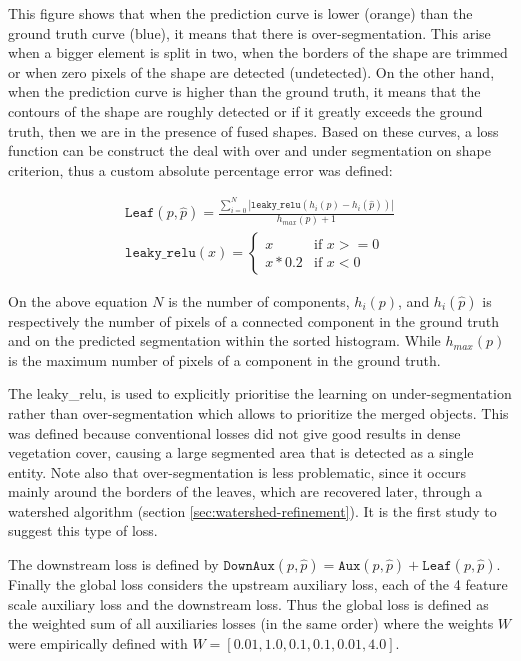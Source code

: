 \documentclass[../thesis.tex]{subfiles}
\begin{document}
    This figure shows that when the prediction curve is lower (orange) than the ground truth curve (blue), it means that there is over-segmentation. This arise when a bigger element is split in two, when the borders of the shape are trimmed or when zero pixels of the shape are detected (undetected). On the other hand, when the prediction curve is higher than the ground truth, it means that the contours of the shape are roughly detected or if it greatly exceeds the ground truth, then we are in the presence of fused shapes. Based on these curves, a loss function can be construct the deal with over and under segmentation on shape criterion, thus a custom absolute percentage error was defined:
    
    \begin{eqnarray}
    \texttt{Leaf}(p, \hat{p}) = \frac{\sum_{i=0}^{N} |\texttt{leaky\_relu}(h_i(p)-h_i(\hat{p}))| }{h_{max}(p)+1} \\
    \texttt{leaky\_relu}(x) =
    \begin{cases}
    \mbox{$x$} & \mbox{if } x >= 0\\
    \mbox{$x*0.2$} & \mbox{if } x < 0
    \end{cases}
    \end{eqnarray}
    
    On the above equation $N$ is the number of components, $h_i(p)$, and $h_i(\hat{p})$ is respectively the number of pixels of a connected component in the ground truth and on the predicted segmentation within the sorted histogram. While $h_{max}(p)$ is the maximum number of pixels of a component in the ground truth.
    
    \newpage
    The leaky\_relu, is used to explicitly prioritise the learning on under-segmentation rather than over-segmentation which allows to prioritize the merged objects. This was defined because conventional losses did not give good results in dense vegetation cover, causing a large segmented area that is detected as a single entity. Note also that over-segmentation is less problematic, since it occurs mainly around the borders of the leaves, which are recovered later, through a watershed algorithm (section \ref{sec:watershed-refinement}). It is the first study to suggest this type of loss.
    
    The downstream loss is defined by $\texttt{DownAux}(p, \hat{p}) = \texttt{Aux}(p, \hat{p}) + \texttt{Leaf}(p, \hat{p})$. Finally the global loss considers the upstream auxiliary loss, each of the 4 feature scale auxiliary loss and the downstream loss. Thus the global loss is defined as the weighted sum of all auxiliaries losses (in the same order) where the weights $W$ were empirically defined with $W = [0.01, 1.0, 0.1, 0.1, 0.01, 4.0]$.
    
\end{document}
